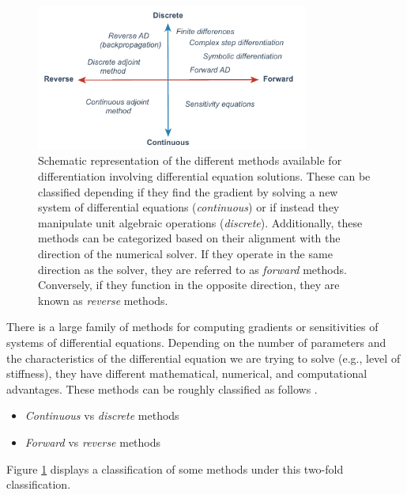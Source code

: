 \begin{figure}[t]
    \centering
    \includegraphics[width=0.80\textwidth]{figures/scheme-methods.pdf}
    \caption{Schematic representation of the different methods available for differentiation involving differential equation solutions. These can be classified depending if they find the gradient by solving a new system of differential equations (\textit{continuous}) or if instead they manipulate unit algebraic operations (\textit{discrete}). Additionally, these methods can be categorized based on their alignment with the direction of the numerical solver. If they operate in the same direction as the solver, they are referred to as \textit{forward} methods. Conversely, if they function in the opposite direction, they are known as \textit{reverse} methods.}
    \label{fig:scheme-all-methods}
\end{figure}

There is a large family of methods for computing gradients or sensitivities of systems of differential equations. 
Depending on the number of parameters and the characteristics of the differential equation we are trying to solve (e.g., level of stiffness), they have different mathematical, numerical, and computational advantages.
These methods can be roughly classified as  follows \cite{ma2021comparison}. 
\begin{itemize}
    \item \textit{Continuous} vs \textit{discrete}  methods
    \item \textit{Forward} vs \textit{reverse} methods
\end{itemize}
Figure \ref{fig:scheme-all-methods} displays a classification of some methods under this two-fold classification. 

